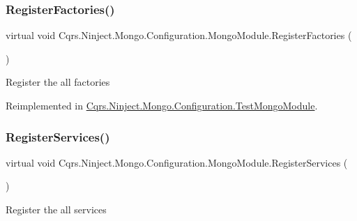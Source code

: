 \subsubsection{\texorpdfstring{Register\+Factories()}{RegisterFactories()}}
{\footnotesize\ttfamily virtual void Cqrs.\+Ninject.\+Mongo.\+Configuration.\+Mongo\+Module.\+Register\+Factories (\begin{DoxyParamCaption}{ }\end{DoxyParamCaption})\hspace{0.3cm}{\ttfamily [virtual]}}



Register the all factories 



Reimplemented in \hyperlink{classCqrs_1_1Ninject_1_1Mongo_1_1Configuration_1_1TestMongoModule_a8cce844ec177b88a0be2ca8f71b2bc6b_a8cce844ec177b88a0be2ca8f71b2bc6b}{Cqrs.\+Ninject.\+Mongo.\+Configuration.\+Test\+Mongo\+Module}.

\mbox{\label{classCqrs_1_1Ninject_1_1Mongo_1_1Configuration_1_1MongoModule_a6d0edb4e718b9588671382dd2e183ebc_a6d0edb4e718b9588671382dd2e183ebc}} 
\subsubsection{\texorpdfstring{Register\+Services()}{RegisterServices()}}
{\footnotesize\ttfamily virtual void Cqrs.\+Ninject.\+Mongo.\+Configuration.\+Mongo\+Module.\+Register\+Services (\begin{DoxyParamCaption}{ }\end{DoxyParamCaption})\hspace{0.3cm}{\ttfamily [virtual]}}



Register the all services 

